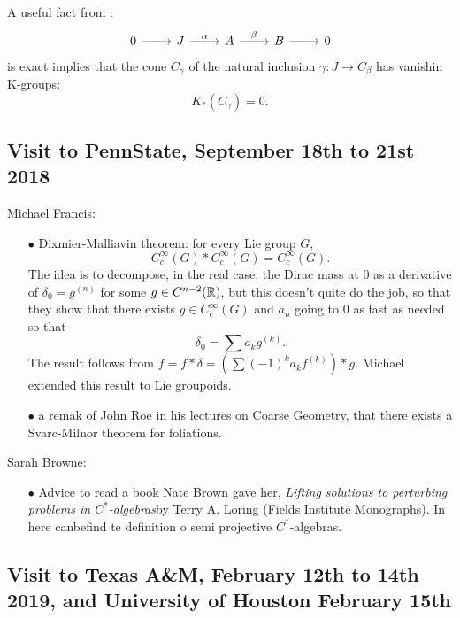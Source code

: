 A useful fact from \cite{HLS}: 
\[\begin{tikzcd}0 \arrow{r} & J \arrow{r}{\alpha} & A \arrow{r}{\beta} &  B \arrow{r} & 0 \end{tikzcd}\]
is exact implies that the cone $C_\gamma$ of the natural inclusion $\gamma : J \rightarrow C_\beta$ has vanishin K-groups: \[K_*(C_\gamma) = 0.\]

\subsection{Visit to PennState, September 18th to 21st 2018}

Michael Francis:

\begin{itemize}
\item[$\bullet$] Dixmier-Malliavin theorem: for every Lie group $G$,
\[ C_c^\infty(G) \ast C_c^\infty(G) = C_c^\infty(G). \]
The idea is to decompose, in the real case, the Dirac mass at $0$ as a derivative of $\delta_0 =g^{(n)}$ for some $g\in C^{n-2}(\mathbb R)$, but this doesn't quite do the job, so that they show that there exists $g\in C_c^\infty(G)$ and $a_n$ going to $0$ as fast as needed so that 
\[\delta_ 0 = \sum a_k g^{(k)}.\]
The result follows from $f=f\ast \delta = (\sum (-1)^k a_k f^{(k)}) \ast g$. Michael extended this result to Lie groupoids.\\
\item[$\bullet$] a remak of John Roe in his lectures on Coarse Geometry, that there exists a Svarc-Milnor theorem for foliations.\\
\end{itemize}

Sarah Browne:

\begin{itemize}
\item[$\bullet$] Advice to read a book Nate Brown gave her, \textit{Lifting solutions to perturbing problems in $C^*$-algebras}by Terry A. Loring (Fields Institute Monographs). In here canbefind te definition o semi projective $C^*$-algebras.
\end{itemize}

\newpage
\subsection{Visit to Texas A\&M, February 12th to 14th 2019, and University of Houston February 15th}


